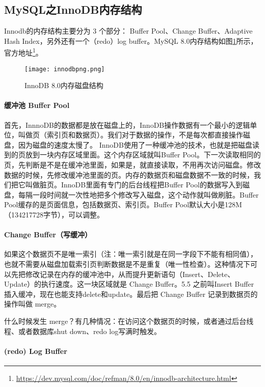 \documentclass[../../../interview-questions.tex]{subfiles}
\begin{document}
\subsection{MySQL之InnoDB内存结构}

Innodb的内存结构主要分为 3 个部分： Buffer Pool、Change Buffer、Adaptive Hash Index，另外还有一个（redo）log buffer。MySQL 8.0内存结构如图\ref{fig:innodbmemory}所示，官方地址\footnote{\url{https://dev.mysql.com/doc/refman/8.0/en/innodb-architecture.html}}。

\begin{figure}[htbp]
    \centering
    \texttt{[image: innodbpng.png]}
    \caption{InnoDB 8.0内存磁盘结构}
    \label{fig:innodbmemory}
\end{figure}

\paragraph{缓冲池 Buffer Pool}

首先，InnnoDB的数据都是放在磁盘上的，InnoDB操作数据有一个最小的逻辑单位，叫做页（索引页和数据页）。我们对于数据的操作，不是每次都直接操作磁盘，因为磁盘的速度太慢了。 InnoDB使用了一种缓冲池的技术，也就是把磁盘读到的页放到一块内存区域里面。这个内存区域就叫Buffer Pool。下一次读取相同的页，先判断是不是在缓冲池里面，如果是，就直接读取，不用再次访问磁盘。修改数据的时候，先修改缓冲池里面的页。内存的数据页和磁盘数据不一致的时候，我们把它叫做脏页。InnoDB里面有专门的后台线程把Buffer Pool的数据写入到磁盘，每隔一段时间就一次性地把多个修改写入磁盘，这个动作就叫做刷脏。Buffer Pool缓存的是页面信息，包括数据页、索引页。Buffer Pool默认大小是128M（134217728字节），可以调整。

\paragraph{Change Buffer（写缓冲）}

如果这个数据页不是唯一索引（注：唯一索引就是在同一字段下不能有相同值），也就不需要从磁盘加载索引页判断数据是不是重复（唯一性检查）。这种情况下可以先把修改记录在内存的缓冲池中，从而提升更新语句（Insert、Delete、Update）的执行速度。这一块区域就是 Change Buffer。5.5 之前叫Insert Buffer 插入缓冲，现在也能支持delete和update。最后把 Change Buffer 记录到数据页的操作叫做 merge。

什么时候发生 merge？有几种情况：在访问这个数据页的时候，或者通过后台线程、或者数据库shut down、redo log写满时触发。

\paragraph{(redo) Log Buffer}
\end{document}
